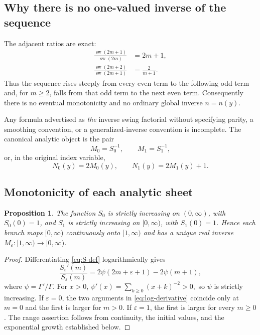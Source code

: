 \documentclass[11pt,a4paper]{article}
\theoremstyle{clean}
\newtheorem{proposition}[theorem]{Proposition}
\theoremstyle{definition}
\newcommand{\sw}{\operatorname{sw}}
\newcommand{\eps}{\varepsilon}
\begin{document}
\subsection{Why there is no one-valued inverse of the sequence}

The adjacent ratios are exact:
\begin{align}
 \frac{\sw(2m+1)}{\sw(2m)}&=2m+1,
 \label{eq:up-ratio}\\
 \frac{\sw(2m+2)}{\sw(2m+1)}&=\frac{2}{m+1}.
 \label{eq:down-ratio}
\end{align}
Thus the sequence rises steeply from every even term to the following odd term and, for \(m\ge2\), falls from that odd term to the next even term.  Consequently there is no eventual monotonicity and no ordinary global inverse \(n=n(y)\).

\begin{warningbox}
Any formula advertised as \emph{the} inverse swing factorial without specifying parity, a smoothing convention, or a generalized-inverse convention is incomplete.  The canonical analytic object is the pair
\[
 M_0=S_0^{-1},\qquad M_1=S_1^{-1},
\]
or, in the original index variable,
\[
 N_0(y)=2M_0(y),\qquad N_1(y)=2M_1(y)+1.
\]
\end{warningbox}

\subsection{Monotonicity of each analytic sheet}

\begin{proposition}\label{prop:monotonicity}
The function \(S_0\) is strictly increasing on \((0,\infty)\), with \(S_0(0)=1\), and \(S_1\) is strictly increasing on \([0,\infty)\), with \(S_1(0)=1\).  Hence each branch maps \([0,\infty)\) continuously onto \([1,\infty)\) and has a unique real inverse \(M_\eps:[1,\infty)\to[0,\infty)\).
\end{proposition}

\begin{proof}
Differentiating \cref{eq:S-def} logarithmically gives
\begin{equation}
 \frac{S_\eps'(m)}{S_\eps(m)}
 =2\psi(2m+\eps+1)-2\psi(m+1),
 \label{eq:log-derivative}
\end{equation}
where \(\psi=\Gamma'/\Gamma\).  For \(x>0\),
\(
 \psi'(x)=\sum_{k\ge0}(x+k)^{-2}>0,
\)
so \(\psi\) is strictly increasing.  If \(\eps=0\), the two arguments in \cref{eq:log-derivative} coincide only at \(m=0\) and the first is larger for \(m>0\).  If \(\eps=1\), the first is larger for every \(m\ge0\).  The range assertion follows from continuity, the initial values, and the exponential growth established below.
\end{proof}
\end{document}
